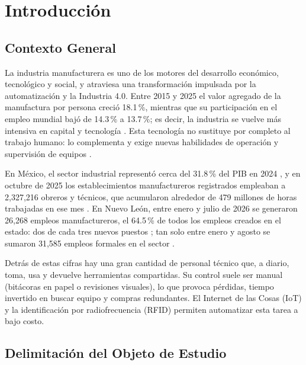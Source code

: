 \section{Introducción}

\subsection{Contexto General}
La industria manufacturera es uno de los motores del desarrollo económico, tecnológico y social, y atraviesa una transformación impulsada por la automatización y la Industria 4.0. Entre 2015 y 2025 el valor agregado de la manufactura por persona creció 18.1\,\%, mientras que su participación en el empleo mundial bajó de 14.3\,\% a 13.7\,\%; es decir, la industria se vuelve más intensiva en capital y tecnología \parencite{un_goal9_2026}. Esta tecnología no sustituye por completo al trabajo humano: lo complementa y exige nuevas habilidades de operación y supervisión de equipos \parencite{oit_ia_manufactura_2026}.

En México, el sector industrial representó cerca del 31.8\,\% del PIB en 2024 \parencite{banco_mundial_industria_mexico_2025}, y en octubre de 2025 los establecimientos manufactureros registrados empleaban a 2,327,216 obreros y técnicos, que acumularon alrededor de 479 millones de horas trabajadas en ese mes \parencite{inegi_immex_2025}. En Nuevo León, entre enero y julio de 2026 se generaron 26,268 empleos manufactureros, el 64.5\,\% de todos los empleos creados en el estado: dos de cada tres nuevos puestos \parencite{gob_nl_ano_manufacturero_2026}; tan solo entre enero y agosto se sumaron 31,585 empleos formales en el sector \parencite{gob_nl_empleo_septiembre_2026}.

Detrás de estas cifras hay una gran cantidad de personal técnico que, a diario, toma, usa y devuelve herramientas compartidas. Su control suele ser manual (bitácoras en papel o revisiones visuales), lo que provoca pérdidas, tiempo invertido en buscar equipo y compras redundantes. El Internet de las Cosas (IoT) y la identificación por radiofrecuencia (RFID) permiten automatizar esta tarea a bajo costo.

\subsection{Delimitación del Objeto de Estudio}
\begin{center}
  
  \label{fig:ods9}
\end{center}

